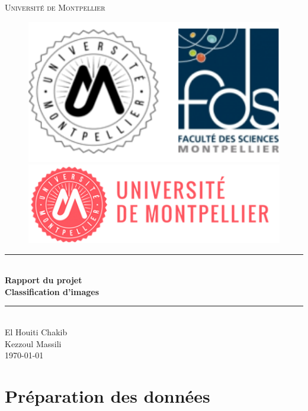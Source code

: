 \documentclass[12pt,titlepage]{article}
\begin{document}
\begin{titlepage}
\newcommand{\HRule}{\rule{\linewidth}{0.5mm}}
\center
\textsc{\LARGE
Université de Montpellier
} \\[1cm]
\begin{figure}[h]
	\begin{minipage}[c]{.46\linewidth}
		\centering
		\includegraphics[width=1\textwidth]{img/fds.png}
	\end{minipage}
	\hfill%
	\begin{minipage}[c]{.46\linewidth}
		\centering
		\includegraphics[width=1\textwidth]{img/univ-montpellier.png}
	\end{minipage}
\end{figure}

\HRule \\[0.4cm]
{ \huge \bfseries Rapport du projet \\Classification d'images}
\HRule \\[1.5cm]
El Houiti Chakib \\
Kezzoul Massili
\\[1cm]
\today \\ [1cm]
\end{titlepage}

\section{Préparation des données}
\end{document}
